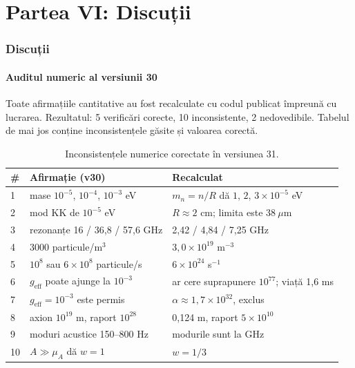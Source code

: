 \documentclass[11pt,a4paper]{article}
\begin{document}
\newpage
\part*{Partea VI: Discuții}

\section{Discuții}
\subsection{Auditul numeric al versiunii 30}
Toate afirmațiile cantitative au fost recalculate cu codul publicat împreună cu lucrarea. Rezultatul: 5 verificări corecte, 10 inconsistente, 2 nedovedibile. Tabelul de mai jos conține inconsistențele găsite și valoarea corectă.

\begin{table}[H]
\centering
\small
\begin{tabular}{@{}p{0.5cm}p{6.2cm}p{5.2cm}@{}}
\toprule
\# & \textbf{Afirmație (v30)} & \textbf{Recalculat} \\ \midrule
1 & mase $10^{-5}$, $10^{-4}$, $10^{-3}$ eV & $m_n = n/R$ dă $1$, $2$, $3 \times 10^{-5}$ eV \\
2 & mod KK de $10^{-5}$ eV & $R \approx 2$ cm; limita este $38\ \mu$m \\
3 & rezonanțe 16 / 36{,}8 / 57{,}6 GHz & 2{,}42 / 4{,}84 / 7{,}25 GHz \\
4 & 3000 particule/m$^3$ & $3{,}0\times10^{19}$ m$^{-3}$ \\
5 & $10^8$ sau $6\times10^8$ particule/s & $6\times10^{24}$ s$^{-1}$ \\
6 & $g_{\text{eff}}$ poate ajunge la $10^{-3}$ & ar cere suprapunere $10^{77}$; viață 1{,}6 ms \\
7 & $g_{\text{eff}} = 10^{-3}$ este permis & $\alpha \approx 1{,}7\times10^{32}$, exclus \\
8 & axion $10^{19}$ m, raport $10^{28}$ & 0{,}124 m, raport $5\times10^{10}$ \\
9 & moduri acustice 150--800 Hz & modurile sunt la GHz \\
10 & $A \gg \mu_A$ dă $w = 1$ & $w = 1/3$ \\ \bottomrule
\end{tabular}
\caption{Inconsistențele numerice corectate în versiunea 31.}
\label{tab:audit}
\end{table}
\end{document}

